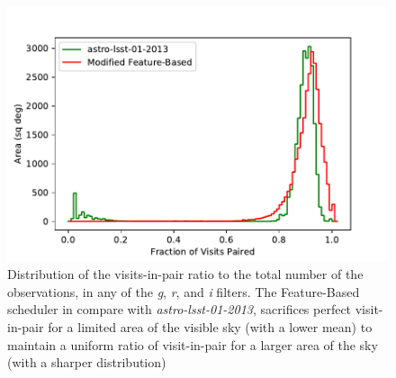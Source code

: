 \documentclass[11pt]{article}
\theoremstyle{definition}
\begin{document}
%
\begin{figure}[h!]
\centering
\includegraphics[width=.4\linewidth]{Figures/PairHist.pdf}
\caption{Distribution of the visits-in-pair ratio to the total number of the observations, in any of the \textit{g}, \textit{r}, and \textit{i} filters. The Feature-Based scheduler in compare with \textit{astro-lsst-01-2013}, sacrifices perfect visit-in-pair for a limited area of the visible sky (with a lower mean) to maintain a uniform ratio of visit-in-pair for a larger area of the sky (with a sharper distribution)}
\label{fig_10yrs_pair_hist}
\end{figure}
\end{document}
